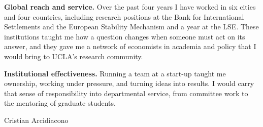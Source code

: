 \documentclass[11pt]{article}
\begin{document}
\textbf{Global reach and service.} Over the past four years I have worked in six cities and four countries, including research positions at the Bank for International Settlements and the European Stability Mechanism and a year at the LSE. These institutions taught me how a question changes when someone must act on its answer, and they gave me a network of economists in academia and policy that I would bring to UCLA's research community.

\textbf{Institutional effectiveness.} Running a team at a start-up taught me ownership, working under pressure, and turning ideas into results. I would carry that sense of responsibility into departmental service, from committee work to the mentoring of graduate students.

\vspace{0.3cm}

Cristian Arcidiacono
\end{document}
